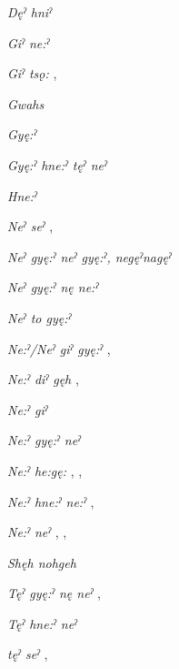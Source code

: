 \begin{CayugaRelated}
\item{}\textit{Dęˀ hniˀ} \\
\item{}\textit{Giˀ ne:ˀ} \\
\item{}\textit{Giˀ tsǫ:} , \\
\item{}\textit{Gwahs} \\
\item{}\textit{Gyę:ˀ} \\
\item{}\textit{Gyę:ˀ hne:ˀ tęˀ neˀ} \\
\item{}\textit{Hne:ˀ} \\
\item{}\textit{Neˀ seˀ} , \\
\item{}\textit{Neˀ gyę:ˀ neˀ gyę:ˀ, negęˀnagęˀ} \\
\item{}\textit{Neˀ gyę:ˀ nę ne:ˀ} \\
\item{}\textit{Neˀ to gyę:ˀ} \\
\item{}\textit{Ne:ˀ/Neˀ giˀ gyę:ˀ} , \\
\item{}\textit{Ne:ˀ diˀ gęh} , \\
\item{}\textit{Ne:ˀ giˀ} \\
\item{}\textit{Ne:ˀ gyę:ˀ neˀ} \\
\item{}\textit{Ne:ˀ he:gę:} , , \\
\item{}\textit{Ne:ˀ hne:ˀ ne:ˀ} , \\
\item{}\textit{Ne:ˀ neˀ} , , \\
\item{}\textit{Shęh nohgeh} \\
\item{}\textit{Tęˀ gyę:ˀ nę neˀ} , \\
\item{}\textit{Tęˀ hne:ˀ neˀ} \\
\item{}\textit{tęˀ seˀ} , 
\end{CayugaRelated}


